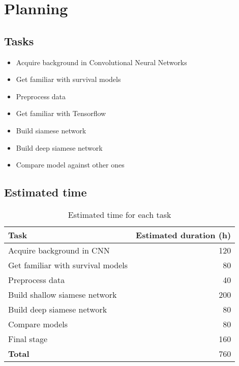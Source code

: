 \section{Planning}
\subsection{Tasks}
\begin{frame}{\insertsubsec}
  \begin{itemize}
    \item Acquire background in Convolutional Neural Networks
    \item Get familiar with survival models
    \item Preprocess data
    \item Get familiar with Tensorflow
    \item Build siamese network
    \item Build deep siamese network
    \item Compare model against other ones
  \end{itemize}
\end{frame}

\subsection{Estimated time}
\begin{frame}{\insertsubsec}
  \begin{table}[H]
    \centering{}
    \begin{tabular}{|l|r|}
      \hline
      Task & Estimated duration (h) \\ \hline \hline
      Acquire background in CNN & 120 \\ \hline
      Get familiar with survival models & 80 \\ \hline
      Preprocess data & 40 \\ \hline
      Build shallow siamese network & 200 \\ \hline
      Build deep siamese network & 80 \\ \hline
      Compare models & 80 \\ \hline
      Final stage & 160 \\ 
  
    
      \hline \hline
      \textbf{Total} & 760 \\
      \hline
    \end{tabular}
    \caption{Estimated time for each task \label{tab:time}}
  \end{table}
\end{frame}

